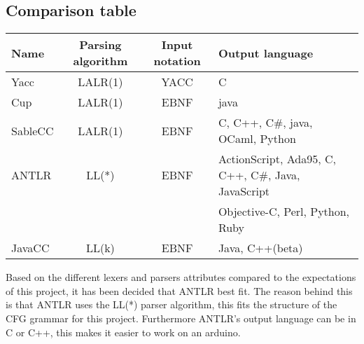 \subsection{Comparison table}
\begin{tabular}{|l|c|c|l|}
\hline
Name & Parsing algorithm & Input notation & Output language\\ \hline
Yacc & LALR(1) & YACC & C\\ \hline
Cup & LALR(1) & EBNF & java\\ \hline
SableCC & LALR(1) & EBNF & C, C++, C\#, java, OCaml, Python\\ \hline
ANTLR & LL(*) & EBNF & ActionScript, Ada95, C, C++, C\#, Java, JavaScript \\
~&~&~&Objective-C, Perl, Python, Ruby\\ \hline
JavaCC & LL(k) & EBNF & Java, C++(beta)\\ \hline
\end{tabular}

Based on the different lexers and parsers attributes compared to the expectations of this project, it has been decided that ANTLR best fit. The reason behind this is that ANTLR uses the LL(*) parser algorithm, this fits the structure of the CFG grammar for this project. Furthermore ANTLR's output language can be in C or C++, this makes it easier to work on an arduino.